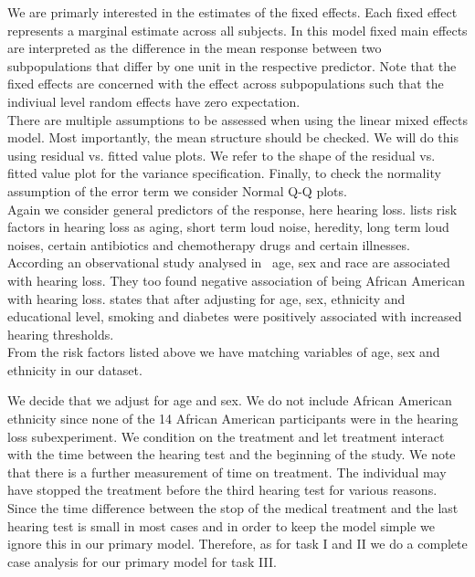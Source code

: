 \documentclass[paper=a4, fontsize=11pt]{scrartcl} %
\numberwithin{equation}{section} %
\numberwithin{figure}{section} %
\numberwithin{table}{section} %
\begin{document}
We are primarly interested in the estimates of the fixed effects. Each fixed effect represents a marginal estimate across all subjects. In this model fixed main effects are interpreted as the difference in the mean response between two subpopulations that differ by one unit in the respective predictor. Note that the fixed effects are concerned with the effect across subpopulations such that the indiviual level random effects have zero expectation.\\

There are multiple assumptions to be assessed when using the linear mixed effects model. Most importantly, the mean structure should be checked. We will do this using residual vs. fitted value plots. We refer to the shape of the residual vs. fitted value plot for the variance specification. Finally, to check the normality assumption of the error term we consider Normal Q-Q plots.\\

Again we consider general predictors of the response, here hearing loss. \cite{mayohearing} lists risk factors in hearing loss as aging, short term loud noise, heredity, long term loud noises, certain antibiotics and chemotherapy drugs and certain illnesses. According an observational study analysed in~\cite{lin} age, sex and race are associated with hearing loss. They too found negative association of being African American with hearing loss. \cite{agrawal} states that after adjusting for age, sex, ethnicity and educational level, smoking and diabetes were positively associated with increased hearing thresholds.\\

From the risk factors listed above we have matching variables of age, sex and ethnicity in our dataset.

We decide that we adjust for age and sex. We do not include African American ethnicity since none of the 14 African American participants were in the hearing loss subexperiment. We condition on the treatment and let treatment interact with the time between the hearing test and the beginning of the study. We note that there is a further measurement of time on treatment. The individual may have stopped the treatment before the third hearing test for various reasons. Since the time difference between the stop of the medical treatment and the last hearing test is small in most cases and in order to keep the model simple we ignore this in our primary model.
Therefore, as for task I and II we do a complete case analysis for our primary model for task III. %
\end{document}
